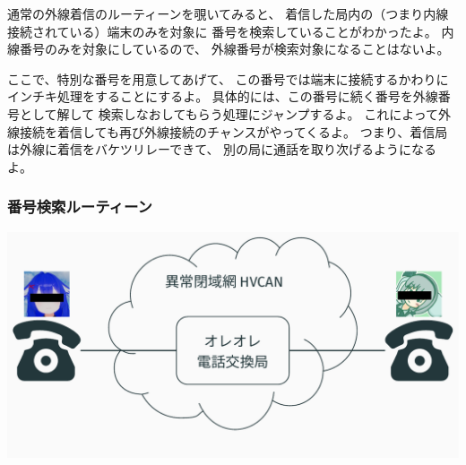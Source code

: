\documentclass[
  lualatex,
  aspectratio=169,
  14pt
]{beamer}
\begin{document}
\begin{frame}
{    通常の外線着信のルーティーンを覗いてみると、
    着信した局内の（つまり内線接続されている）端末のみを対象に
    番号を検索していることがわかったよ。
    内線番号のみを対象にしているので、
    外線番号が検索対象になることはないよ。

    ここで、特別な番号を用意してあげて、
    この番号では端末に接続するかわりにインチキ処理をすることにするよ。
    具体的には、この番号に続く番号を外線番号として解して
    検索しなおしてもらう処理にジャンプするよ。
    これによって外線接続を着信しても再び外線接続のチャンスがやってくるよ。
    つまり、着信局は外線に着信をバケツリレーできて、
    別の局に通話を取り次げるようになるよ。
  }
\end{frame}

\begin{frame}
  \frametitle{番号検索ルーティーン}

  \includegraphics[page=9,width=\linewidth]{./images/pictures.pdf}
\end{frame}
\end{document}
